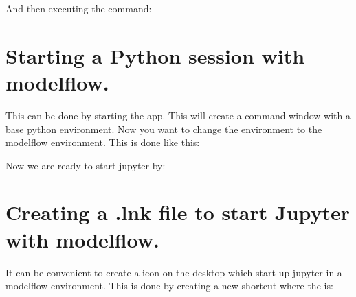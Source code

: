 \documentclass[letterpaper,10pt,english]{jupyterBook}
\begin{document}
\begin{sphinxVerbatim}[commandchars=\\\{\}]
\PYGZbs{}\PYGZbs{}\PYGZbs{} \PYGZbs{} 
  

\end{sphinxVerbatim}

\sphinxAtStartPar
And then executing the command:

\begin{sphinxVerbatim}[commandchars=\\\{\}]
     



\end{sphinxVerbatim}


\section{Starting a Python session with modelflow.}
\label{\detokenize{content/03_Installation/Installing:starting-a-python-session-with-modelflow}}
\sphinxAtStartPar
This can be done by starting the  app. This will create a command window with a base python environment. Now you want to change the environment to the modelflow environment. This is done like this:

\begin{sphinxVerbatim}[commandchars=\\\{\}]
  

\end{sphinxVerbatim}

\sphinxAtStartPar
Now we are ready to start jupyter by:

\begin{sphinxVerbatim}[commandchars=\\\{\}]
       
 
\end{sphinxVerbatim}


\section{Creating a .lnk file to start Jupyter with modelflow.}
\label{\detokenize{content/03_Installation/Installing:creating-a-lnk-file-to-start-jupyter-with-modelflow}}
\sphinxAtStartPar
It can be convenient to create a icon on the desktop which start up jupyter in a modelflow environment. This is done by creating a new shortcut where the  is:
\end{document}
